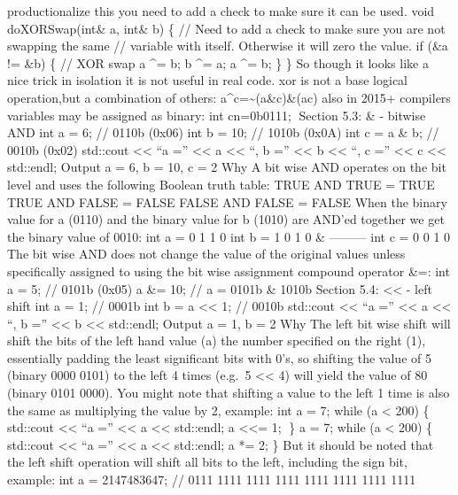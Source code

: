 productionalize this you need to add a check to make sure it can be
used. void doXORSwap(int\& a, int\& b) \{ // Need to add a check to make
sure you are not swapping the same // variable with itself. Otherwise it
will zero the value. if (\&a != \&b) \{ // XOR swap a \^{}= b; b \^{}=
a; a \^{}= b; \} \} So though it looks like a nice trick in isolation it
is not useful in real code. xor is not a base logical operation,but a
combination of others: a\^{}c=\textasciitilde(a\&c)\&(a\textbar c) also
in 2015+ compilers variables may be assigned as binary: int cn=0b0111;
Section 5.3: \& - bitwise AND int a = 6; // 0110b (0x06) int b = 10; //
1010b (0x0A) int c = a \& b; // 0010b (0x02) std::cout
\textless\textless{} ``a ='' \textless\textless{} a \textless\textless{}
``, b ='' \textless\textless{} b \textless\textless{} ``, c =''
\textless\textless{} c \textless\textless{} std::endl; Output a = 6, b =
10, c = 2 Why A bit wise AND operates on the bit level and uses the
following Boolean truth table: TRUE AND TRUE = TRUE TRUE AND FALSE =
FALSE FALSE AND FALSE = FALSE When the binary value for a (0110) and the
binary value for b (1010) are AND'ed together we get the binary value of
0010: int a = 0 1 1 0 int b = 1 0 1 0 \& --------- int c = 0 0 1 0 The
bit wise AND does not change the value of the original values unless
speciﬁcally assigned to using the bit wise assignment compound operator
\&=: int a = 5; // 0101b (0x05) a \&= 10; // a = 0101b \& 1010b Section
5.4: \textless\textless{} - left shift int a = 1; // 0001b int b = a
\textless\textless{} 1; // 0010b std::cout \textless\textless{} ``a =''
\textless\textless{} a \textless\textless{} ``, b =''
\textless\textless{} b \textless\textless{} std::endl; Output a = 1, b =
2 Why The left bit wise shift will shift the bits of the left hand value
(a) the number speciﬁed on the right (1), essentially padding the least
signiﬁcant bits with 0's, so shifting the value of 5 (binary 0000 0101)
to the left 4 times (e.g.~5 \textless\textless{} 4) will yield the value
of 80 (binary 0101 0000). You might note that shifting a value to the
left 1 time is also the same as multiplying the value by 2, example: int
a = 7; while (a \textless{} 200) \{ std::cout \textless\textless{} ``a
='' \textless\textless{} a \textless\textless{} std::endl; a
\textless\textless= 1; \} a = 7; while (a \textless{} 200) \{ std::cout
\textless\textless{} ``a ='' \textless\textless{} a \textless\textless{}
std::endl; a *= 2; \} But it should be noted that the left shift
operation will shift all bits to the left, including the sign bit,
example: int a = 2147483647; // 0111 1111 1111 1111 1111 1111 1111 1111
